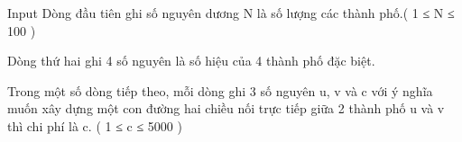 Input
Dòng đầu tiên ghi số nguyên dương N là số lượng các thành phố.( 1 ≤ N ≤ 100 )  

   Dòng thứ hai ghi 4 số nguyên là số hiệu của 4 thành phố đặc biệt.  

   Trong một số dòng tiếp theo, mỗi dòng ghi 3 số nguyên u, v và c với ý nghĩa muốn xây dựng một con đường hai chiều nối trực tiếp giữa 2 thành phố u và v thì chi phí là c.  ( 1 ≤ c ≤ 5000 )